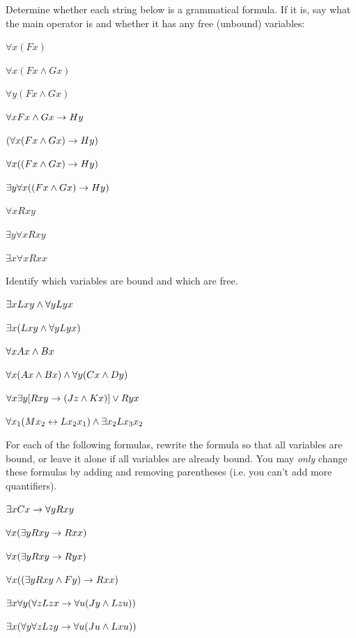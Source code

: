 \practiceproblems
\problempart Determine whether each string below is a grammatical formula.  If it is, say what the main operator is and whether it has any free (unbound) variables:

\begin{earg}
\item $\forall x(Fx)$
\item $\forall x(Fx \land Gx)$
\item $\forall y(Fx \land Gx)$
\item $\forall xFx \wedge Gx \rightarrow Hy$
\item $(\forall x(Fx \wedge Gx) \rightarrow Hy)$
\item $\forall x((Fx \wedge Gx) \rightarrow Hy)$
\item $\exists y \forall x((Fx \wedge Gx) \rightarrow Hy)$
\item $\forall xRxy$
\item $\exists y \forall xRxy$
\item $\exists x \forall xRxx$
\end{earg}


\problempart
\label{pr.freeFOL}
Identify which variables are bound and which are free.
\begin{earg}
\item $\exists x Lxy \wedge \forall y Lyx$
\item $\exists x (Lxy \wedge \forall y Lyx)$
\item $\forall x Ax \wedge Bx$
\item $\forall x (Ax \wedge Bx) \wedge \forall y(Cx \wedge Dy)$
\item $\forall x\exists y[Rxy \rightarrow (Jz \wedge Kx)] \vee Ryx$
\item $\forall x_1(Mx_2 \leftrightarrow Lx_2x_1) \wedge \exists x_2 Lx_3x_2$
\end{earg}

\problempart
For each of the following formulas, rewrite the formula so that all variables are bound, or leave it alone if all variables are already bound.  You may \emph{only} change these formulas by adding and removing parentheses (i.e. you can't add more quantifiers).

\begin{earg}
\item $\exists xCx \rightarrow \forall yRxy$
\item $\forall x(\exists yRxy \rightarrow Rxx)$
\item $\forall x(\exists yRxy \rightarrow Ryx)$
\item $\forall x((\exists yRxy \wedge Fy) \rightarrow Rxx)$
\item $\exists x\forall y(\forall zLzx \rightarrow \forall u(Jy \wedge Lzu))$
\item $\exists x(\forall y \forall zLzy \rightarrow \forall u(Ju \wedge Lxu))$
\end{earg}
